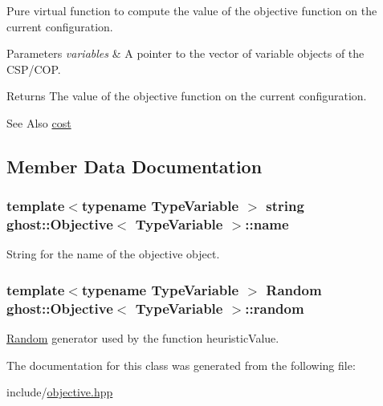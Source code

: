 Pure virtual function to compute the value of the objective function on the current configuration. 


\begin{DoxyParams}{Parameters}
{\em variables} & A pointer to the vector of variable objects of the C\-S\-P/\-C\-O\-P. \\
\hline
\end{DoxyParams}
\begin{DoxyReturn}{Returns}
The value of the objective function on the current configuration. 
\end{DoxyReturn}
\begin{DoxySeeAlso}{See Also}
\hyperlink{classghost_1_1Objective_ac46e9305c3a92db9dff2d233a7c07088}{cost} 
\end{DoxySeeAlso}


\subsection{Member Data Documentation}
\hypertarget{classghost_1_1Objective_a02aee324f6958b6c533f27ec430690fe}{
\subsubsection[{name}]{\setlength{\rightskip}{0pt plus 5cm}template$<$typename Type\-Variable $>$ string {\bf ghost\-::\-Objective}$<$ Type\-Variable $>$\-::name\hspace{0.3cm}{\ttfamily [protected]}}}\label{classghost_1_1Objective_a02aee324f6958b6c533f27ec430690fe}


String for the name of the objective object. 

\hypertarget{classghost_1_1Objective_ae4b72b2e592243707f478ec1adbef234}{
\subsubsection[{random}]{\setlength{\rightskip}{0pt plus 5cm}template$<$typename Type\-Variable $>$ {\bf Random} {\bf ghost\-::\-Objective}$<$ Type\-Variable $>$\-::random\hspace{0.3cm}{\ttfamily [protected]}}}\label{classghost_1_1Objective_ae4b72b2e592243707f478ec1adbef234}


\hyperlink{classghost_1_1Random}{Random} generator used by the function heuristic\-Value. 



The documentation for this class was generated from the following file\-:\begin{DoxyCompactItemize}
\item 
include/\hyperlink{objective_8hpp}{objective.\-hpp}\end{DoxyCompactItemize}

